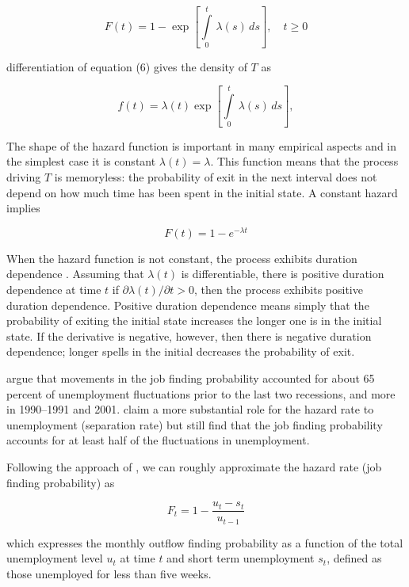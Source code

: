 \documentclass[
  11pt,
]{article}
\begin{document}
\begin{equation}
F(t) = 1 - \exp\left[\int\limits_{0}^{t}\,\lambda(s)\,ds \right], \quad t \geq 0
\end{equation}

differentiation of equation (6) gives the density of \(T\) as

\begin{equation}
f(t) = \lambda(t)\exp\left[\int\limits_{0}^{t}\,\lambda(s)\,ds \right],
\end{equation}

The shape of the hazard function is important in many empirical aspects
and in the simplest case it is constant \(\lambda(t) = \lambda\). This
function means that the process driving \(T\) is memoryless: the
probability of exit in the next interval does not depend on how much
time has been spent in the initial state. A constant hazard implies

\[
F(t) = 1 - e^{-\lambda t}
\]

When the hazard function is not constant, the process exhibits duration
dependence \citep{Lanc90, vdb96}. Assuming that \(\lambda(t)\) is
differentiable, there is positive duration dependence at time \(t\) if
\(\partial\lambda(t)/\partial t > 0\), then the process exhibits
positive duration dependence. Positive duration dependence means simply
that the probability of exiting the initial state increases the longer
one is in the initial state. If the derivative is negative, however,
then there is negative duration dependence; longer spells in the initial
decreases the probability of exit.

\cite{elsby09b} argue that movements in the job finding probability
accounted for about 65 percent of unemployment fluctuations prior to the
last two recessions, and more in 1990--1991 and 2001. \cite{fujita09}
claim a more substantial role for the hazard rate to unemployment
(separation rate) but still find that the job finding probability
accounts for at least half of the fluctuations in unemployment.

Following the approach of \cite{Shimer12}, we can roughly approximate
the hazard rate (job finding probability) as

\begin{equation}
F_{t} = 1 - \frac{u_{t} - s_{t}}{u_{t-1}}
\end{equation}

which expresses the monthly outflow finding probability as a function of
the total unemployment level \(u_{t}\) at time \(t\) and short term
unemployment \(s_{t}\), defined as those unemployed for less than five
weeks.
\end{document}
